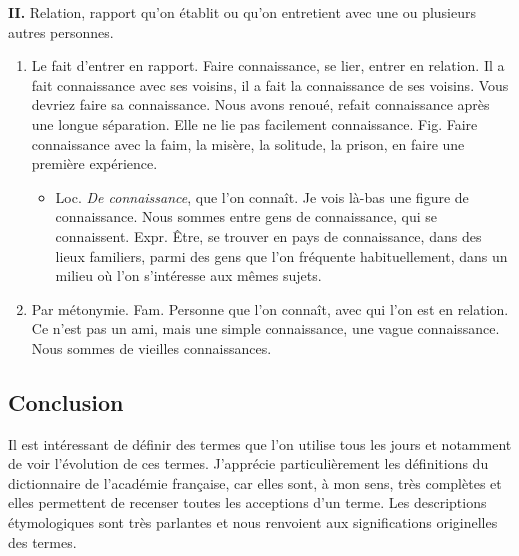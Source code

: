 \begin{graybox}
    \medskip
    \textbf{II.} Relation, rapport qu'on établit ou qu'on entretient avec une
    ou plusieurs autres personnes.

    \begin{enumerate}
        \item Le fait d'entrer en rapport. Faire connaissance, se lier, entrer
        en relation. Il a fait connaissance avec ses voisins, il a fait la
        connaissance de ses voisins. Vous devriez faire sa connaissance. Nous
        avons renoué, refait connaissance après une longue séparation. Elle ne
        lie pas facilement connaissance. Fig. Faire connaissance avec la faim,
        la misère, la solitude, la prison, en faire une première expérience.
        \begin{itemize}
            \item Loc. \textit{De connaissance}, que l'on connaît. Je vois
            là-bas une figure de connaissance. Nous sommes entre gens de
            connaissance, qui se connaissent. Expr. Être, se trouver en pays
            de connaissance, dans des lieux familiers, parmi des gens que l'on
            fréquente habituellement, dans un milieu où l'on s'intéresse aux
            mêmes sujets.
        \end{itemize}

        \item Par métonymie. Fam. Personne que l'on connaît, avec qui l'on est
        en relation. Ce n'est pas un ami, mais une simple connaissance, une
        vague connaissance. Nous sommes de vieilles connaissances.
    \end{enumerate}

    \subsection{Conclusion}

    Il est intéressant de définir des termes que l'on utilise tous les jours et
    notamment de voir l'évolution de ces termes. J'apprécie particulièrement les
    définitions du dictionnaire de l'académie française, car elles sont, à mon sens,
    très complètes et elles permettent de recenser toutes les acceptions d'un terme.
    Les descriptions étymologiques sont très parlantes et nous renvoient aux significations
    originelles des termes.


\end{graybox}

